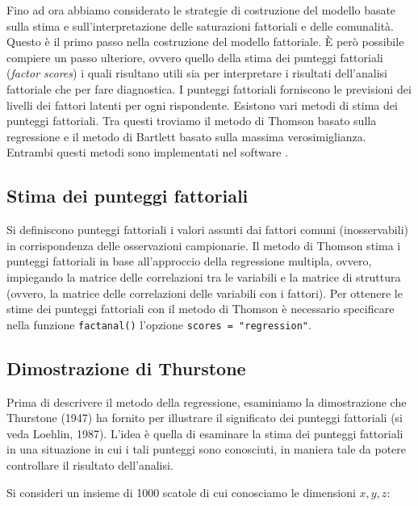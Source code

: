 \documentclass[
  11pt,
]{krantz}
\theoremstyle{definition}
\theoremstyle{definition}
\theoremstyle{definition}
\theoremstyle{definition}
\theoremstyle{remark}
\begin{document}
Fino ad ora abbiamo considerato le strategie di costruzione del modello basate sulla stima e sull'interpretazione delle saturazioni fattoriali e delle comunalità. Questo è il primo passo nella costruzione del modello fattoriale. È però possibile compiere un passo ulteriore, ovvero quello della stima dei punteggi fattoriali (\emph{factor scores}) i quali risultano utili sia per interpretare i risultati dell'analisi fattoriale che per fare diagnostica. I punteggi fattoriali forniscono le previsioni dei livelli dei fattori latenti per ogni rispondente. Esistono vari metodi di stima dei punteggi fattoriali. Tra questi troviamo il metodo di Thomson basato sulla regressione e il metodo di Bartlett basato sulla massima verosimiglianza. Entrambi questi metodi sono implementati nel software .

\hypertarget{stima-dei-punteggi-fattoriali}{%
\subsection{Stima dei punteggi fattoriali}\label{stima-dei-punteggi-fattoriali}}

Si definiscono punteggi fattoriali i valori assunti dai fattori comuni (inosservabili) in corrispondenza delle osservazioni campionarie. Il metodo di Thomson stima i punteggi fattoriali in base all'approccio della regressione multipla, ovvero, impiegando la matrice delle correlazioni tra le variabili e la matrice di struttura (ovvero, la matrice delle correlazioni delle variabili con i fattori). Per ottenere le stime dei punteggi fattoriali con il metodo di Thomson è necessario specificare nella funzione \texttt{factanal()} l'opzione \texttt{scores\ =\ "regression"}.

\hypertarget{dimostrazione-di-thurstone}{%
\subsection{Dimostrazione di Thurstone}\label{dimostrazione-di-thurstone}}

Prima di descrivere il metodo della regressione, esaminiamo la dimostrazione che Thurstone (1947) ha fornito per illustrare il significato dei punteggi fattoriali (si veda Loehlin, 1987). L'idea è quella di esaminare la stima dei punteggi fattoriali in una situazione in cui i tali punteggi sono conosciuti, in maniera tale da potere controllare il risultato dell'analisi.

Si consideri un insieme di 1000 scatole di cui conosciamo le dimensioni \(x, y, z\):
\end{document}
